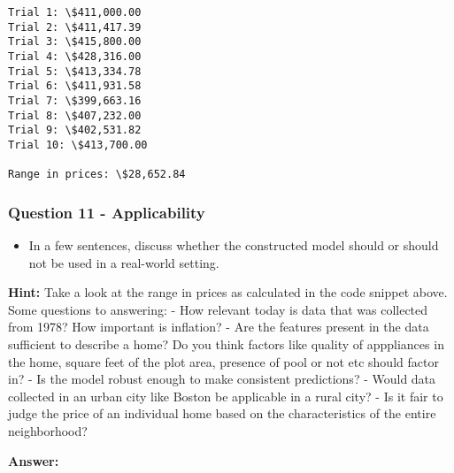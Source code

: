 \documentclass[11pt]{article}
\providecommand{\tightlist}{%
      \setlength{\itemsep}{0pt}\setlength{\parskip}{0pt}}
\begin{document}
    \begin{Verbatim}[commandchars=\\\{\}]
Trial 1: \$411,000.00
Trial 2: \$411,417.39
Trial 3: \$415,800.00
Trial 4: \$428,316.00
Trial 5: \$413,334.78
Trial 6: \$411,931.58
Trial 7: \$399,663.16
Trial 8: \$407,232.00
Trial 9: \$402,531.82
Trial 10: \$413,700.00

Range in prices: \$28,652.84

    \end{Verbatim}

    \subsubsection{Question 11 -
Applicability}\label{question-11---applicability}

\begin{itemize}
\tightlist
\item
  In a few sentences, discuss whether the constructed model should or
  should not be used in a real-world setting.
\end{itemize}

\textbf{Hint:} Take a look at the range in prices as calculated in the
code snippet above. Some questions to answering: - How relevant today is
data that was collected from 1978? How important is inflation? - Are the
features present in the data sufficient to describe a home? Do you think
factors like quality of apppliances in the home, square feet of the plot
area, presence of pool or not etc should factor in? - Is the model
robust enough to make consistent predictions? - Would data collected in
an urban city like Boston be applicable in a rural city? - Is it fair to
judge the price of an individual home based on the characteristics of
the entire neighborhood?

    \textbf{Answer: }
\end{document}

